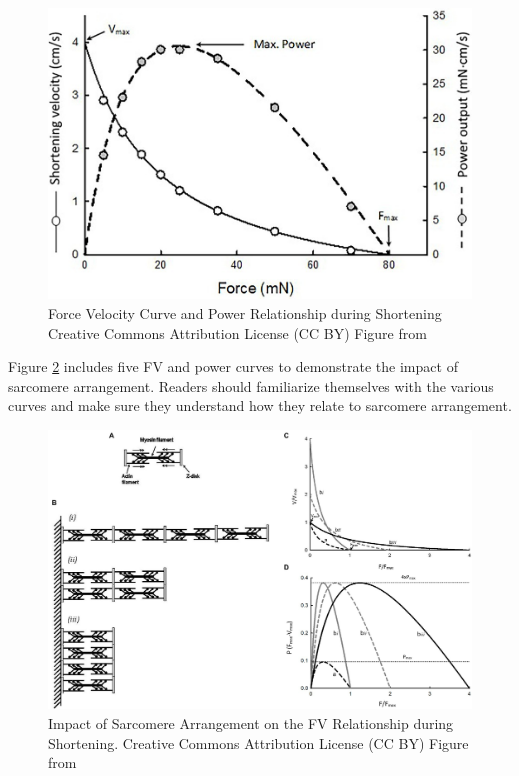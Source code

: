 \begin{figure}[!ht]
    \centering
    \includegraphics[width=1\linewidth]{./figure/fv_shortening_1.jpg}
    \caption{Force Velocity Curve and Power Relationship during Shortening \footnotesize{Creative Commons Attribution License (CC BY) Figure from \cite{seow_hills_2013}}}
    \label{fig:fv_shortening_1}
\end{figure}

Figure \ref{fig:fv_shortening_2} includes five FV and power curves to demonstrate the impact of sarcomere arrangement. Readers should familiarize themselves with the various curves and make sure they understand how they relate to sarcomere arrangement.

\begin{figure}[!ht]
    \centering
    \includegraphics[width=1\linewidth]{./figure/fv_shortening_2.jpg}
    \caption{Impact of Sarcomere Arrangement on the FV Relationship during Shortening. \footnotesize{Creative Commons Attribution License (CC BY) Figure from \cite{seow_molecular_2022}}}
    \label{fig:fv_shortening_2}
\end{figure}

